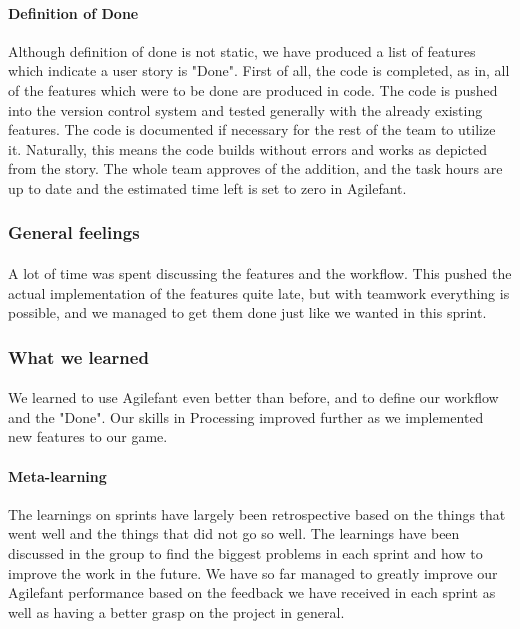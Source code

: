 \paragraph{Definition of Done} Although definition of done is not static, we have produced a list of features which indicate a user story is "Done". First of all, the code is completed, as in, all of the features which were to be done are produced in code. The code is pushed into the version control system and tested generally with the already existing features. The code is documented if necessary for the rest of the team to utilize it. Naturally, this means the code builds without errors and works as depicted from the story. The whole team approves of the addition, and the task hours are up to date and the estimated time left is set to zero in Agilefant.


\subsubsection{General feelings}

\paragraph{} A lot of time was spent discussing the features and the workflow. This pushed the actual implementation of the features quite late, but with teamwork everything is possible, and we managed to get them done just like we wanted in this sprint.

\subsubsection{What we learned}

\paragraph{} We learned to use Agilefant even better than before, and to define our workflow and the "Done". Our skills in Processing improved further as we implemented new features to our game.

\paragraph{Meta-learning} The learnings on sprints have largely been retrospective based on the things that went well and the things that did not go so well. The learnings have been discussed in the group to find the biggest problems in each sprint and how to improve the work in the future. We have so far managed to greatly improve our Agilefant performance based on the feedback we have received in each sprint as well as having a better grasp on the project in general.

